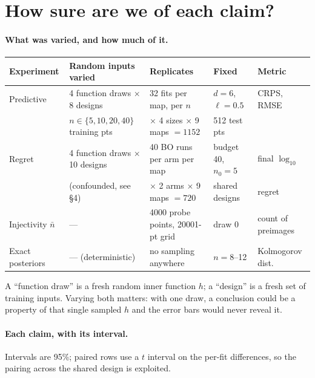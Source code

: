 \section{How sure are we of each claim?}
\label{sec:confidence}

\paragraph{What was varied, and how much of it.}

\begin{center}
\footnotesize
\setlength{\tabcolsep}{4pt}
\begin{tabular}{@{}p{1.7cm}p{3.6cm}p{3.5cm}p{2.2cm}p{2.3cm}@{}}
\toprule
Experiment & Random inputs varied & Replicates & Fixed & Metric \\
\midrule
Predictive
 & 4 function draws $\times$ 8 designs
 & 32 fits per map, per $n$
 & $d=6$, $\ell=0.5$
 & CRPS, RMSE \\
 & $n \in \{5,10,20,40\}$ training pts
 & $\times$ 4 sizes $\times$ 9 maps $=1152$
 & 512 test pts
 & \\
\addlinespace
Regret
 & 4 function draws $\times$ 10 designs
 & 40 BO runs per arm per map
 & budget 40, $n_0=5$
 & final $\log_{10}$ \\
 & (confounded, see \S4)
 & $\times$ 2 arms $\times$ 9 maps $=720$
 & shared designs
 & regret \\
\addlinespace
Injectivity $\bar n$
 & ---
 & 4000 probe points, 20001-pt grid
 & draw 0
 & count of preimages \\
\addlinespace
Exact posteriors
 & --- (deterministic)
 & no sampling anywhere
 & $n=8$--12
 & Kolmogorov dist.\ \\
\bottomrule
\end{tabular}
\end{center}

\noindent A ``function draw'' is a fresh random inner function $h$; a
``design'' is a fresh set of training inputs. Varying both matters: with one
draw, a conclusion could be a property of that single sampled $h$ and the
error bars would never reveal it.

\paragraph{Each claim, with its interval.} Intervals are 95\%; paired rows use
a $t$ interval on the per-fit differences, so the pairing across the shared
design is exploited.

